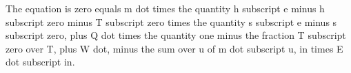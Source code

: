 The equation is zero equals m dot times the quantity h subscript e minus h subscript zero minus T subscript zero times the quantity s subscript e minus s subscript zero, plus Q dot times the quantity one minus the fraction T subscript zero over T, plus W dot, minus the sum over u of m dot subscript u, in times E dot subscript in.